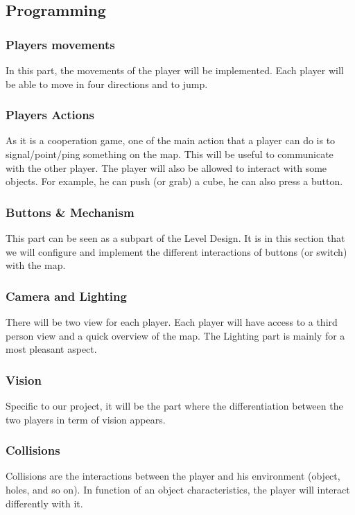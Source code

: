 \documentclass[12pt]{article}
\begin{document}
	\subsection{Programming}     
		\subsubsection{Players movements}
			In this part, the movements of the player will be implemented. Each player will be able to move in four directions and to jump.  
            
		\subsubsection{Players Actions}
			As it is a cooperation game, one of the main action that a player can do is to signal/point/ping something on the map. This will be useful to communicate with the other player.
            The player will also be allowed to interact with some objects. For example, he can push (or grab) a cube, he can also press a button.
            
        \subsubsection{Buttons \& Mechanism}
			This part can be seen as a subpart of the Level Design. It is in this section that we will configure and implement the different interactions of buttons (or switch) with the map.

		\subsubsection{Camera and Lighting}
			There will be two view for each player. Each player will have access to a third person view and a quick overview of the map.
     		The Lighting part is mainly for a most pleasant aspect.
            
        \subsubsection{Vision}
			Specific to our project, it will be the part where the differentiation between the two players in term of vision appears.
            
		\subsubsection{Collisions}
			Collisions are the interactions between the player and his environment (object, holes, and so on). In function of an object characteristics, the player will interact differently with it.
\end{document}
